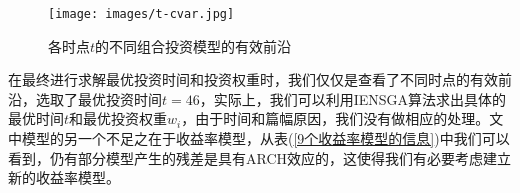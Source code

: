         \begin{figure}[H]
        \centering
        \texttt{[image: images/t-cvar.jpg]}
        \caption{各时点$t$的不同组合投资模型的有效前沿}
        \label{各时点t的不同组合投资模型的有效前沿}
        \end{figure}
        \par
        在最终进行求解最优投资时间和投资权重时，我们仅仅是查看了不同时点的有效前沿，选取了最优投资时间$t=46$，实际上，我们可以利用IENSGA算法求出具体的最优时间$t$和最优投资权重$w_i$，由于时间和篇幅原因，我们没有做相应的处理。文中模型的另一个不足之在于收益率模型，从表(\ref{9个收益率模型的信息})中我们可以看到，仍有部分模型产生的残差是具有ARCH效应的，这使得我们有必要考虑建立新的收益率模型。


